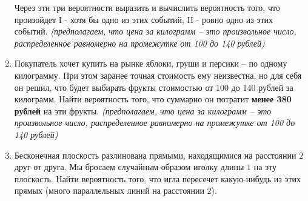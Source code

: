 \documentclass{article}
\begin{document}
\begin{enumerate}
    Через эти три вероятности выразить и вычислить вероятность того,
    что произойдет I - хотя бы одно из этих событий, II - ровно одно из этих событий.
    \textit{(предполагаем, что цена за килограмм  – это произвольное число, распределенное равномерно на промежутке от 100 до 140 рублей)}

    \item Покупатель хочет купить на рынке яблоки, груши и персики – по одному килограмму.
    При этом заранее точная стоимость ему неизвестна, но для себя он решил, что будет выбирать фрукты стоимостью от 100 до 140 рублей за килограмм.
    Найти вероятность того, что суммарно он потратит \textbf{менее 380 рублей} на эти фрукты.
    \textit{(предполагаем, что цена за килограмм  – это произвольное число, распределенное равномерно на промежутке от 100 до 140 рублей)}
    
    \item Бесконечная плоскость разлинована  прямыми, находящимися на расстоянии $2$ друг от друга.
    Мы бросаем случайным образом иголку длины $1$ на эту плоскость.
    Найти вероятность того, что игла пересечет какую-нибудь из этих прямых
    (много параллельных линий на расстоянии $2$).
    
\end{enumerate}
\end{document}
